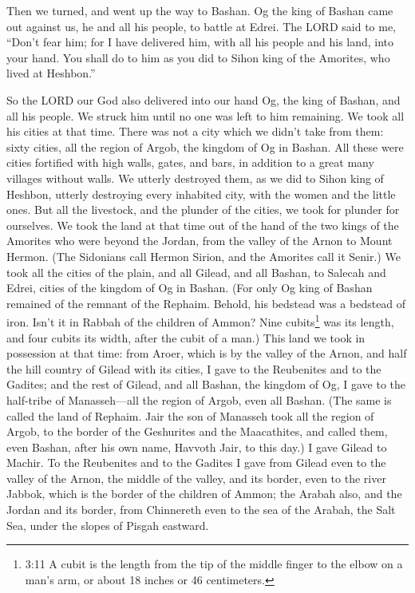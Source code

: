\mychapter{} \myverse*{}Then we turned, and went up the way to Bashan. Og the king of Bashan
came out against us, he and all his people, to battle at Edrei.
\myverse{}The LORD said to me, “Don’t fear him; for I have delivered him, with all his
people and his land, into your hand. You shall do to him as you did to Sihon king of the Amorites, who
lived at Heshbon.”


\myverse{}So the LORD our God also delivered into our hand Og, the king of
Bashan, and all his people. We struck him until no one was left to him remaining.
\myverse{}We took all his cities at that time. There was not a city which we didn’t take
from them: sixty cities, all the region of Argob, the kingdom of Og in Bashan.
\myverse{}All these were cities fortified with high walls, gates, and bars, in addition
to a great many villages without walls.
\myverse{}We utterly destroyed them, as we did to Sihon king of Heshbon, utterly destroying
every inhabited city, with the women and the little ones.
\myverse{}But all the livestock, and the plunder of the cities, we took for plunder for
ourselves.
\myverse{}We took the land at that time out of the hand of the two kings of the Amorites
who were beyond the Jordan, from the valley of the Arnon to Mount Hermon.
\myverse{}(The Sidonians call Hermon Sirion, and the Amorites call it Senir.)
\myverse{}We took all the cities of the plain, and all Gilead, and all Bashan, to Salecah
and Edrei, cities of the kingdom of Og in Bashan.
\myverse{}(For only Og king of Bashan remained of the remnant of the Rephaim. Behold,
his bedstead was a bedstead of iron. Isn’t it in Rabbah of the children of Ammon? Nine cubits\footnote{3:11 A cubit is the length from the tip of the middle finger to the elbow on a man’s arm, or about
	18 inches or 46 centimeters.} was its length, and four cubits its width, after the cubit of a
man.)
\myverse{}This land we took in possession at that time: from Aroer, which is by the
valley of the Arnon, and half the hill country of Gilead with its cities, I gave to the Reubenites and
to the Gadites;
\myverse{}and the rest of Gilead, and all Bashan, the kingdom of Og, I gave to the half-tribe
of Manasseh—all the region of Argob, even all Bashan. (The same is called the land of Rephaim.
\myverse{}Jair the son of Manasseh took all the region of Argob, to the border of the
Geshurites and the Maacathites, and called them, even Bashan, after his own name, Havvoth Jair, to this
day.)
\myverse{}I gave Gilead to Machir.
\myverse{}To the Reubenites and to the Gadites I gave from Gilead even to the valley
of the Arnon, the middle of the valley, and its border, even to the river Jabbok, which is the border
of the children of Ammon;
\myverse{}the Arabah also, and the Jordan and its border, from Chinnereth even to the
sea of the Arabah, the Salt Sea, under the slopes of Pisgah eastward.


